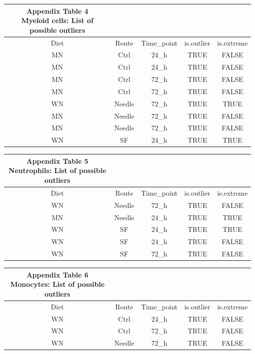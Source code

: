 \documentclass[
  12pt,
  letterpaper,
]{article}
\begin{document}
\begin{longtable}{ccccc}
\caption*{
{\large \textbf{Appendix Table 4}} \\ 
{\small \textbf{Myeloid cells: List of possible outliers}}
} \\ 
\toprule
Diet & Route & Time\_point & is.outlier & is.extreme \\ 
\midrule\addlinespace[2.5pt]
MN & Ctrl & 24\_h & TRUE & FALSE \\ 
MN & Ctrl & 24\_h & TRUE & FALSE \\ 
MN & Ctrl & 72\_h & TRUE & FALSE \\ 
MN & Ctrl & 72\_h & TRUE & FALSE \\ 
WN & Needle & 72\_h & TRUE & TRUE \\ 
MN & Needle & 72\_h & TRUE & FALSE \\ 
MN & Needle & 72\_h & TRUE & FALSE \\ 
WN & SF & 24\_h & TRUE & TRUE \\ 
\bottomrule
\end{longtable}

\begin{longtable}{ccccc}
\caption*{
{\large \textbf{Appendix Table 5}} \\ 
{\small \textbf{Neutrophils: List of possible outliers}}
} \\ 
\toprule
Diet & Route & Time\_point & is.outlier & is.extreme \\ 
\midrule\addlinespace[2.5pt]
WN & Needle & 72\_h & TRUE & FALSE \\ 
MN & Needle & 24\_h & TRUE & TRUE \\ 
WN & SF & 24\_h & TRUE & TRUE \\ 
WN & SF & 24\_h & TRUE & FALSE \\ 
WN & SF & 72\_h & TRUE & FALSE \\ 
\bottomrule
\end{longtable}

\begin{longtable}{ccccc}
\caption*{
{\large \textbf{Appendix Table 6}} \\ 
{\small \textbf{Monocytes: List of possible outliers}}
} \\ 
\toprule
Diet & Route & Time\_point & is.outlier & is.extreme \\ 
\midrule\addlinespace[2.5pt]
WN & Ctrl & 24\_h & TRUE & FALSE \\ 
WN & Ctrl & 72\_h & TRUE & FALSE \\ 
WN & Needle & 72\_h & TRUE & FALSE \\ 
\bottomrule
\end{longtable}
\end{document}
